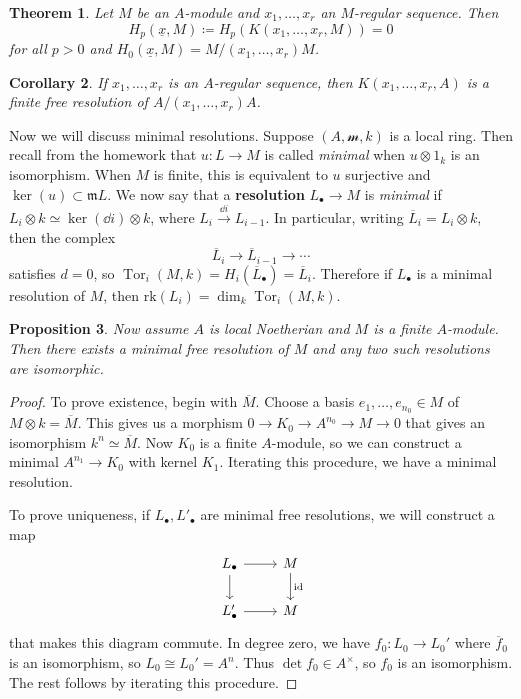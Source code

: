 \documentclass[leqno, openany]{memoir}
\newtheorem{thm}{Theorem}[section]
\newtheorem{cor}[thm]{Corollary}
\newtheorem{prop}[thm]{Proposition}
\theoremstyle{definition}
\theoremstyle{remark}
\theoremstyle{plain}
\theoremstyle{definition}
\theoremstyle{remark}
\newcommand{\mc}[1]{\mathcal{#1}}
\newcommand{\mf}[1]{\mathfrak{#1}}
\newcommand{\mr}[1]{\mathrm{#1}}
\newcommand{\ol}[1]{\overline{#1}}
\newcommand{\ul}[1]{\underline{#1}}
\DeclareMathOperator{\Tor}{Tor}
\begin{document}
\begin{thm} Let $M$ be an $A$-module and $x_1, \ldots, x_r$ an $M$-regular
    sequence. Then \[ H_p(\ul{x}, M) \coloneqq H_p(K(x_1, \ldots, x_r, M)) = 0
    \] for all $p > 0$ and $H_0(\ul{x}, M) = M/(x_1, \ldots, x_r)M$.  \end{thm}

\begin{cor} If $x_1, \ldots, x_r$ is an $A$-regular sequence, then $K(x_1,
\ldots, x_r, A)$ is a finite free resolution of $A/(x_1, \ldots, x_r) A$.
\end{cor}

Now we will discuss minimal resolutions. Suppose $(A, \mc{m}, k)$ is a local
ring. Then recall from the homework that $u \colon L \to M$ is called
\textit{minimal} when $u \otimes 1_k$ is an isomorphism. When $M$ is finite,
this is equivalent to $u$ surjective and $\ker(u) \subset \mf{m} L$. We now say
that a \textbf{resolution} $L_{\bullet} \to M$ is \textit{minimal} if $L_i
\otimes k \simeq \ker (\dd{i}) \otimes k$, where $L_i \xrightarrow{\dd{i}}
L_{i-1}$. In particular, writing $\ol{L}_i = L_i \otimes k$, then the complex
\[ \ol{L}_i \to \ol{L}_{i-1} \to \cdots \] satisfies $d = 0$, so $\Tor_i(M, k)
= H_i(\ol{L}_{\bullet}) = \ol{L}_i$. Therefore if $L_{\bullet}$ is a minimal
resolution of $M$, then $\mr{rk}(L_i) = \dim_k \Tor_i(M, k)$.

\begin{prop} Now assume $A$ is local Noetherian and $M$ is a finite $A$-module.
Then there exists a minimal free resolution of $M$ and any two such resolutions
are isomorphic.  \end{prop}

\begin{proof} To prove existence, begin with $\ol{M}$. Choose a basis $e_1,
    \ldots, e_{n_0} \in M$ of $M \otimes k = \ol{M}$. This gives us a morphism
    $0 \to K_0 \to A^{n_0} \to M \to 0$ that gives an isomorphism $k^n \simeq
    \ol{M}$. Now $K_0$ is a finite $A$-module, so we can construct a minimal
    $A^{n_1} \to K_0$ with kernel $K_1$. Iterating this procedure, we have a
    minimal resolution.

    To prove uniqueness, if $L_{\bullet}, L'_{\bullet}$ are minimal free
    resolutions, we will construct a map \begin{equation*} \begin{tikzcd}
    L_{\bullet} \arrow{r} \arrow{d} & M \arrow{d}{\mr{id}} \\ L'_{\bullet}
\arrow{r} & M \end{tikzcd} \end{equation*} that makes this diagram commute. In
degree zero, we have $f_0 \colon L_0 \to L_0'$ where $\ol{f}_0$ is an
isomorphism, so $L_0 \cong L_0' = A^n$. Thus $\det f_0 \in A^{\times}$, so
$f_0$ is an isomorphism. The rest follows by iterating this procedure.
\end{proof}
\end{document}
